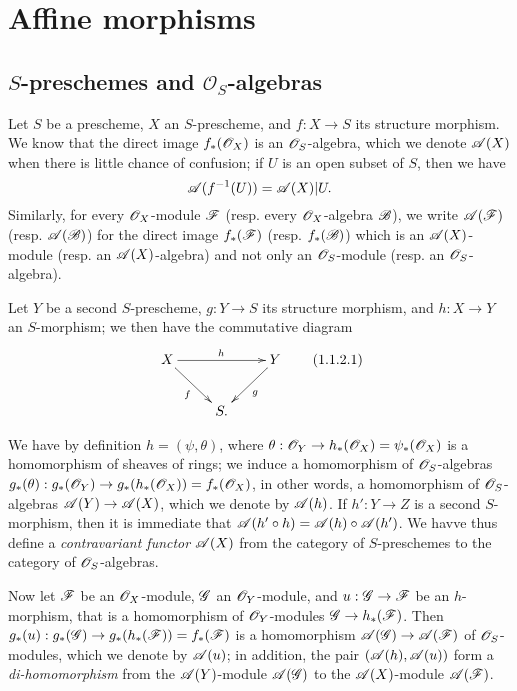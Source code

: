\section{Affine morphisms}
\label{section-affine-morphisms}

\subsection{$S$-preschemes and $\mathcal{O}_S$-algebras}
\label{subsection-s-preschemes-algebras}

\begin{env}[1.1.1]
\label{2.1.1.1}
Let $S$ be a prescheme, $X$ an $S$-prescheme, and $f:X\to S$ its structure morphism.
We know  that the direct image $f_*(\mathscr{O}_X)$ is an $\mathscr{O}_S$-algebra, which we
denote $\mathscr{A}(X)$ when there is little chance of confusion; if $U$ is an open subset of $S$, then we have
\[
  \mathscr{A}(f^{-1}(U))=\mathscr{A}(X)|U.
\]
Similarly, for every $\mathscr{O}_X$-module $\mathscr{F}$ (resp. every $\mathscr{O}_X$-algebra $\mathscr{B}$), we write $\mathscr{A}(\mathscr{F})$ (resp. $\mathscr{A}(\mathscr{B})$) for the direct image $f_*(\mathscr{F})$ (resp. $f_*(\mathscr{B})$) which is an $\mathscr{A}(X)$-module (resp. an $\mathscr{A}(X)$-algebra) and not only an $\mathscr{O}_S$-module (resp. an $\mathscr{O}_S$-algebra).
\end{env}

\begin{env}[1.1.2]
\label{2.1.1.2}
Let $Y$ be a second $S$-prescheme, $g:Y\to S$ its structure morphism, and $h:X\to Y$ an $S$-morphism; we then have the commutative diagram
\[
  \xymatrix{
    X\ar[rr]^h\ar[rd]_f & &
    Y\ar[ld]^g\\
    & S.
  }
  \tag{1.1.2.1}
\]

We have by definition $h=(\psi,\theta)$, where $\theta:\OO_Y\to h_*(\OO_X)=\psi_*(\OO_X)$ is a homomorphism of sheaves of rings; we induce  a homomorphism of $\mathscr{O}_S$-algebras $g_*(\theta):g_*(\OO_Y)\to g_*(h_*(\OO_X))=f_*(\OO_X)$, in other words, a homomorphism of $\mathscr{O}_S$-algebras $\sh{A}(Y)\to\sh{A}(X)$, which we denote by $\mathscr{A}(h)$.
If $h':Y\to Z$ is a second $S$-morphism, then it is immediate that $\mathscr{A}(h'\circ h)=\mathscr{A}(h)\circ\mathscr{A}(h')$.
We havve thus define a \emph{contravariant functor $\mathscr{A}(X)$} from the category of $S$-preschemes to the category of $\mathscr{O}_S$-algebras.

Now let $\mathscr{F}$ be an $\mathscr{O}_X$-module, $\mathscr{G}$ an $\mathscr{O}_Y$-module, and $u:\sh{G}\to\sh{F}$ be an $h$-morphism, that is  a homomorphism of $\mathscr{O}_Y$-modules $\sh{G}\to h_*(\sh{F})$.
Then $g_*(u):g_*(\sh{G})\to g_*(h_*(\sh{F}))=f_*(\sh{F})$ is a homomorphism $\sh{A}(\sh{G})\to\sh{A}(\sh{F})$ of $\mathscr{O}_S$-modules, which we denote by $\mathscr{A}(u)$; in addition, the pair $(\mathscr{A}(h),\mathscr{A}(u))$ form a \emph{di-homomorphism} from the $\mathscr{A}(Y)$-module $\mathscr{A}(\mathscr{G})$ to the $\mathscr{A}(X)$-module $\mathscr{A}(\mathscr{F})$.
\end{env}

